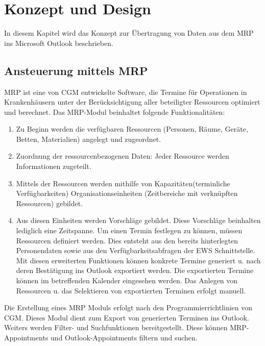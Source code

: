 \chapter{Konzept und Design}
In diesem Kapitel wird das Konzept zur Übertragung von Daten aus dem MRP ins Microsoft Outlook beschrieben. 


\section{Ansteuerung mittels MRP}
MRP ist eine von CGM entwickelte Software, die Termine für Operationen in Krankenhäusern unter der Berücksichtigung aller beteiligter Ressourcen optimiert und berechnet. Das MRP-Modul beinhaltet folgende Funktionalitäten\cite{html5,g3r,g3mrp}:\\
\begin{enumerate}
	\item Zu Beginn werden die verfügbaren Ressourcen (Personen, Räume, Geräte, Betten, Materialien) angelegt und zugeordnet.  
	\item Zuordnung der ressourcenbezogenen Daten: Jeder  Ressource werden Informationen zugeteilt.
	\item Mittels der Ressourcen werden mithilfe von Kapazitäten(terminliche Verfügbarkeiten) Organisationseinheiten (Zeitbereiche mit verknüpften Ressourcen) gebildet.
	\item Aus diesen Einheiten werden Vorschläge gebildet. Diese Vorschläge beinhalten lediglich eine Zeitspanne. Um einen Termin festlegen zu können, müssen Ressourcen  definiert werden. Dies entsteht aus den bereits hinterlegten Personendaten sowie aus den Verfügbarkeitsabfragen der EWS Schnittstelle. Mit diesen erweiterten Funktionen können konkrete Termine generiert u. nach deren Bestätigung ins Outlook exportiert werden. Die exportierten Termine können im betreffenden Kalender eingesehen werden. Das Anlegen von Ressourcen u. das Selektieren von exportierten Terminen erfolgt manuell.\\
\end{enumerate}	

Die Erstellung eines MRP Moduls erfolgt nach den Programmierrichtlinien von CGM. Dieses Modul dient zum Export von generierten Terminen ins Outlook. Weiters werden Filter- und Suchfunktionen bereitgestellt. Diese können MRP-Appointments und Outlook-Appointments filtern und suchen.




